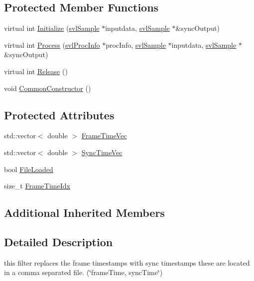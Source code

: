 \subsection*{Protected Member Functions}
\begin{DoxyCompactItemize}
\item 
virtual int \hyperlink{classsvl_filter_frame_time_sync_a0ee91b83ada751d3c4f60d17924a83b0}{Initialize} (\hyperlink{classsvl_sample}{svl\+Sample} $\ast$inputdata, \hyperlink{classsvl_sample}{svl\+Sample} $\ast$\&sync\+Output)
\item 
virtual int \hyperlink{classsvl_filter_frame_time_sync_a1708a14f9994aa0d0e6aeee26d171b10}{Process} (\hyperlink{structsvl_proc_info}{svl\+Proc\+Info} $\ast$proc\+Info, \hyperlink{classsvl_sample}{svl\+Sample} $\ast$inputdata, \hyperlink{classsvl_sample}{svl\+Sample} $\ast$\&sync\+Output)
\item 
virtual int \hyperlink{classsvl_filter_frame_time_sync_a4d156b358adfc87174af51cd32bdc3e6}{Release} ()
\item 
void \hyperlink{classsvl_filter_frame_time_sync_adaa84f1ae10e63da47c886f585251406}{Common\+Constructor} ()
\end{DoxyCompactItemize}
\subsection*{Protected Attributes}
\begin{DoxyCompactItemize}
\item 
std\+::vector$<$ double $>$ \hyperlink{classsvl_filter_frame_time_sync_a7bf99c445800fe0e23a70eba6bd93f3d}{Frame\+Time\+Vec}
\item 
std\+::vector$<$ double $>$ \hyperlink{classsvl_filter_frame_time_sync_a4d5d8201aa1a99de2559bc304ad54678}{Sync\+Time\+Vec}
\item 
bool \hyperlink{classsvl_filter_frame_time_sync_a59978f199103c4f72dd7622029cd290a}{File\+Loaded}
\item 
size\+\_\+t \hyperlink{classsvl_filter_frame_time_sync_a514b0c86986cec46d63d12ca68854842}{Frame\+Time\+Idx}
\end{DoxyCompactItemize}
\subsection*{Additional Inherited Members}


\subsection{Detailed Description}
this filter replaces the frame timestamps with sync timestamps these are located in a comma separated file. (\char`\"{}frame\+Time, sync\+Time\char`\"{}) 

